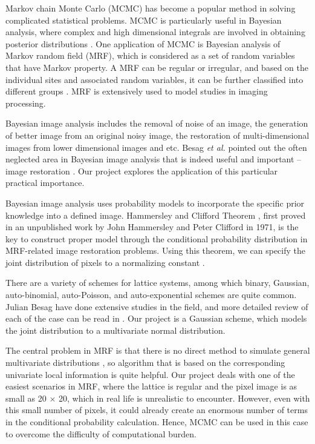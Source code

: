 Markov chain Monte Carlo (MCMC) has become a popular method in solving complicated statistical problems.
MCMC is particularly useful in Bayesian analysis, where complex and high dimensional integrals are involved in obtaining posterior distributions \cite{Cowles1996}. 
One application of MCMC is Bayesian analysis of Markov random field (MRF), which is considered as a set of random variables that have Markov property. 
A MRF can be regular or irregular, and based on the individual sites and associated random variables, it can be further classified into different groups \cite{Besag1993}.
MRF is extensively used to model studies in imaging processing.

Bayesian image analysis includes the removal of noise of an image, the generation of better image from an original noisy image, the restoration of multi-dimensional images from lower dimensional images and etc. 
Besag \textit{et al.} pointed out the often neglected area in Bayesian image analysis that is indeed useful and important -- image restoration \cite{Besag1991}. 
Our project explores the application of this particular practical importance. 

Bayesian image analysis uses probability models to incorporate the specific prior knowledge into a defined image. 
Hammersley and Clifford Theorem \cite{Hammersley1971}, first proved in an unpublished work by John Hammersley and Peter Clifford in 1971, is the key to construct proper model through the conditional probability distribution in MRF-related image restoration problems.
Using this theorem, we can specify the joint distribution of pixels to a normalizing constant \cite{Givens}.

There are a variety of schemes for lattice systems, among which binary, Gaussian, auto-binomial, auto-Poisson, and auto-exponential schemes are quite common. 
Julian Besag have done extensive studies in the field, and more detailed review of each of the case can be read in \cite{Besag1993}.
Our project is a Gaussian scheme, which models the joint distribution to a multivariate normal distribution.

The central problem in MRF is that there is no direct method to simulate general multivariate distributions \cite{Besag1993}, so algorithm that is based on the corresponding univariate local information is quite helpful. 
Our project deals with one of the easiest scenarios in MRF, where the lattice is regular and the pixel image is as small as 20 $\times$ 20, which in real life is unrealistic to encounter. 
However, even with this small number of pixels, it could already create an enormous number of terms in the conditional probability calculation. 
Hence, MCMC can be used in this case to overcome the difficulty of computational burden. 

